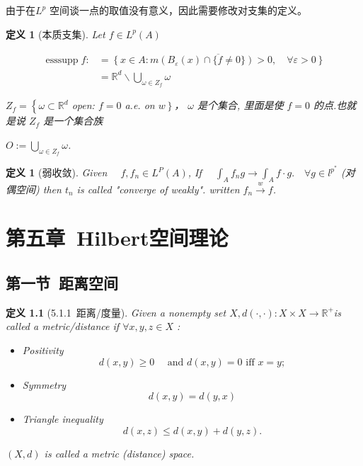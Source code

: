 \documentclass[10pt,openany]{book}
\theoremstyle{thmstyle} %
\theoremstyle{defstyle} %
\newtheorem{definition}[theorem]{定义}
\theoremstyle{prostyle} %
\begin{document}
由于在$L^p$ 空间谈一点的取值没有意义，因此需要修改对支集的定义。

\begin{definition}[本质支集]
Let $f \in L^p(A)$

$$
\begin{aligned}
\operatorname{ess supp} f: & =\overline{\left\{x \in A: m\left(B_{\varepsilon}(x) \cap\{f \neq 0\}\right)>0, \quad \forall \varepsilon>0\right\}} \\
& =\mathbb{R}^d \backslash \bigcup_{\omega \in Z_f} \omega
\end{aligned}
$$

$Z_f=\left\{\omega \subset \mathbb{R}^d\right.$ open: $f=0$ a.e. on $\left.w\right\}$，  $\omega$ 是个集合, 里面是使 $f=0$ 的点.也就是说 $Z_f$ 是一个集合族

$O:=\bigcup_{\omega \in Z_f} \omega$.

\end{definition}

\begin{definition}[弱收敛]
Given $\quad f, f_n \in L^P(A)$, 
If $\quad \int_A f_n g \rightarrow \int_A f \cdot g . \quad \forall g \in l^{p^*}$ (对偶空间)
then $t_n$ is called "converge of weakly".
written $f_n \xrightarrow{w} f$.
\end{definition}






\chapter{第五章~Hilbert空间理论}

\section{第一节~距离空间}

\begin{definition}[5.1.1~距离/度量] 
Given a nonempty set $X, d(\cdot, \cdot): X \times X \rightarrow \mathbb{R}^{+}$is called a metric/distance if $\forall x, y, z \in X$ :
\begin{itemize}
  \item Positivity
  $$
  d(x, y) \geq 0 \quad \text { and } d(x, y)=0 \text { iff } x=y ;
  $$
  \item Symmetry
  $$
  d(x, y)=d(y, x)
  $$
  \item Triangle inequality
  $$
  d(x, z) \leq d(x, y)+d(y, z) .
  $$
\end{itemize}
$(X, d)$ is called a metric (distance) space.
\end{definition}
\end{document}
